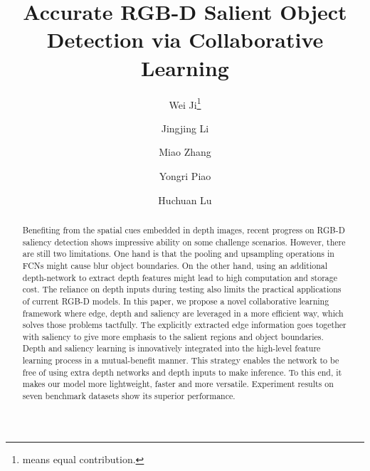 \documentclass[runningheads]{llncs}
\begin{document}
\pagestyle{headings}
\mainmatter
\def\ECCVSubNumber{2916}  

\title{Accurate RGB-D Salient Object Detection via Collaborative Learning} 

\begin{comment}
\titlerunning{Accurate RGB-D Salient Object Detection via Collaborative Learning} 
\authorrunning{ECCV-20 submission ID \ECCVSubNumber} 
\author{ }
\institute{Dalian University of Technology, China\\Pengcheng Lab}
\end{comment}


\author{Wei Ji\thanks{means equal contribution.}\and
Jingjing Li\and
Miao Zhang\textsuperscript{\Letter} \and
Yongri Piao\and
Huchuan Lu}
\maketitle

\begin{abstract}
Benefiting from the spatial cues embedded in depth images, recent progress on RGB-D saliency detection shows impressive ability on some challenge scenarios.
However, there are still two limitations.
One hand is that the pooling and upsampling operations in FCNs might cause blur object boundaries.
On the other hand, using an additional depth-network to extract depth features might lead to high computation and storage cost.
The reliance on depth inputs during testing also limits the practical applications of current RGB-D models. 
In this paper, we propose a novel collaborative learning framework where edge, depth and saliency are leveraged in a more efficient way, which solves those problems tactfully.
The explicitly extracted edge information goes together with saliency to give more emphasis to the salient regions and object boundaries.
Depth and saliency learning is innovatively integrated into the high-level feature learning process in a mutual-benefit manner.
This strategy enables the network to be free of using extra depth networks and depth inputs to make inference.
To this end, it makes our model more lightweight, faster and more versatile.
Experiment results on seven benchmark datasets show its superior performance.
\end{abstract}
\end{document}
